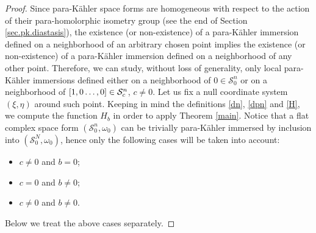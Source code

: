 \documentclass[10pt,a4paper]{amsart}
\newcommand{\pk}{para-K\"ahler }
\newcommand{\s}{\mathcal{S}}
\begin{document}
\begin{proof}

Since \pk space forms are homogeneous with respect to the action of their para-homolorphic isometry group (see the end of Section \ref{sec.pk.diastasis}), the existence (or non-existence) of  a \pk immersion defined on a neighborhood of an arbitrary chosen point implies the existence (or non-existence) of a \pk immersion defined on a neighborhood of any other point. Therefore, we can study, without loss of generality, only local \pk immersions defined either on a neighborhood of  $0\in \s_0^n$ or on a neighborhood of  $[1,0\mathellipsis,0]\in\s^n_c$, $c\neq 0$. Let us fix a null coordinate system $(\xi,\eta)$ around such point. Keeping in mind the definitions \eqref{dn}, \eqref{dpn} and \eqref{H},
we compute the function $H_b$ in order to apply Theorem \ref{main}.
Notice that a flat complex space form $(\s_0^n,\omega_0)$ can be trivially \pk immersed by inclusion into $(\s_0^N,\omega_0)$, hence only the following cases will be taken into account:
\begin{itemize} 
\item $c\neq 0$ and $b= 0$;
\item $c= 0$ and $b\neq 0$;
\item $c\neq 0$ and $b\neq 0$.
\end{itemize} 
Below we treat the above cases separately.



\end{proof}
\end{document}
